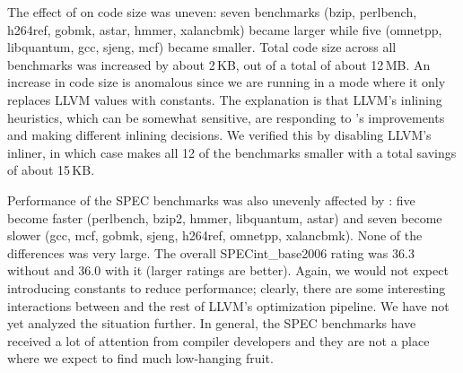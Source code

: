 The effect of \tool{} on code size was uneven: seven benchmarks (bzip,
perlbench, h264ref, gobmk, astar, hmmer, xalancbmk) became larger
while five (omnetpp, libquantum, gcc, sjeng, mcf) became smaller.
%
Total code size across all benchmarks was increased by about 2\,KB, out
of a total of about 12\,MB\@.
%
An increase in code size is anomalous since we are running \tool{} in
a mode where it only replaces LLVM values with constants.
%
The explanation is that LLVM's inlining heuristics, which can be
somewhat sensitive, are responding to \tool's improvements and making
different inlining decisions.
%
We verified this by disabling LLVM's inliner, in which case \tool{}
makes all 12 of the benchmarks smaller with a total savings of about
15\,KB\@.


Performance of the SPEC benchmarks was also unevenly affected by
\tool{}: five become faster (perlbench, bzip2, hmmer, libquantum,
astar) and seven become slower (gcc, mcf, gobmk, sjeng, h264ref,
omnetpp, xalancbmk).
%
None of the differences was very large.
%
The overall SPECint\_base2006 rating was 36.3 without \tool{} and 36.0
with it (larger ratings are better).
%
Again, we would not expect introducing constants to reduce
performance; clearly, there are some interesting interactions between
\tool{} and the rest of LLVM's optimization pipeline.
%
We have not yet analyzed the situation further.
%
In general, the SPEC benchmarks have received a lot of attention from
compiler developers and they are not a place where we expect to find
much low-hanging fruit.
